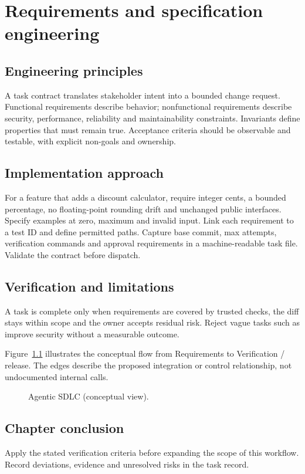 \chapter{Requirements and specification engineering}

\section{Engineering principles}

A task contract translates stakeholder intent into a bounded change request. Functional requirements describe behavior; nonfunctional requirements describe security, performance, reliability and maintainability constraints. Invariants define properties that must remain true. Acceptance criteria should be observable and testable, with explicit non-goals and ownership.

\section{Implementation approach}

For a feature that adds a discount calculator, require integer cents, a bounded percentage, no floating-point rounding drift and unchanged public interfaces. Specify examples at zero, maximum and invalid input. Link each requirement to a test ID and define permitted paths. Capture base commit, max attempts, verification commands and approval requirements in a machine-readable task file. Validate the contract before dispatch.

\section{Verification and limitations}

A task is complete only when requirements are covered by trusted checks, the diff stays within scope and the owner accepts residual risk. Reject vague tasks such as improve security without a measurable outcome.

Figure~\ref{fig:d17} illustrates the conceptual flow from Requirements to Verification / release. The edges describe the proposed integration or control relationship, not undocumented internal calls.

\begin{figure}[htbp]\centering\caption{Agentic SDLC (conceptual view).}\label{fig:d17}\end{figure}

\section{Chapter conclusion}

Apply the stated verification criteria before expanding the scope of this workflow. Record deviations, evidence and unresolved risks in the task record.
